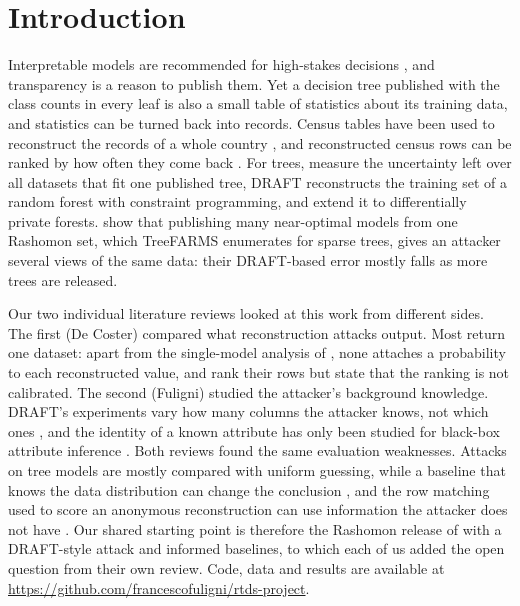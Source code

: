 \section{Introduction}

Interpretable models are recommended for high-stakes decisions \citep{rudin2019stop}, and transparency is a reason to publish them. Yet a decision tree published with the class counts in every leaf is also a small table of statistics about its training data, and statistics can be turned back into records. Census tables have been used to reconstruct the records of a whole country \citep{abowd2025census}, and reconstructed census rows can be ranked by how often they come back \citep{dick2023confidence}. For trees, \citet{ferry2024probabilistic} measure the uncertainty left over all datasets that fit one published tree, DRAFT \citep{ferry2024draft} reconstructs the training set of a random forest with constraint programming, and \citet{gorge2026dp} extend it to differentially private forests. \citet{hsu2026rashomon} show that publishing many near-optimal models from one Rashomon set, which TreeFARMS \citep{xin2022treefarms} enumerates for sparse trees, gives an attacker several views of the same data: their DRAFT-based error mostly falls as more trees are released.

Our two individual literature reviews looked at this work from different sides. The first (De Coster) compared what reconstruction attacks output. Most return one dataset: apart from the single-model analysis of \citet{ferry2024probabilistic}, none attaches a probability to each reconstructed value, and \citet{dick2023confidence} rank their rows but state that the ranking is not calibrated. The second (Fuligni) studied the attacker's background knowledge. DRAFT's experiments vary how many columns the attacker knows, not which ones \citep{ferry2024draft}, and the identity of a known attribute has only been studied for black-box attribute inference \citep{mehnaz2022sensitive}. Both reviews found the same evaluation weaknesses. Attacks on tree models are mostly compared with uniform guessing, while a baseline that knows the data distribution can change the conclusion \citep{abowd2025census,jayaraman2022imputation}, and the row matching used to score an anonymous reconstruction can use information the attacker does not have \citep{wen2025reconstruction}. Our shared starting point is therefore the Rashomon release of \citet{hsu2026rashomon} with a DRAFT-style attack and informed baselines, to which each of us added the open question from their own review. Code, data and results are available at \url{https://github.com/francescofuligni/rtds-project}.
